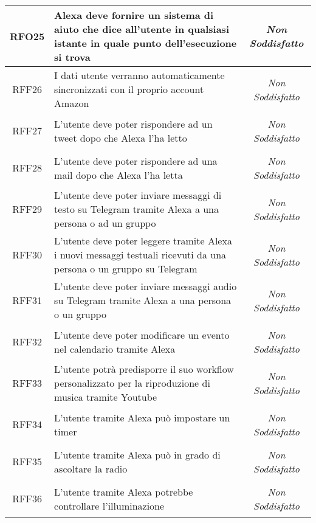\begin{longtable}{|c|>{\centering}m{7cm}|c|}
	\hypertarget{RFO25}{RFO25} & Alexa deve fornire un sistema di aiuto che dice all'utente in qualsiasi istante in quale punto dell'esecuzione si trova & \textit{Non Soddisfatto}\\ \hline
	
	\hypertarget{RFF26}{RFF26} & I dati utente verranno automaticamente sincronizzati con il proprio account Amazon & \textit{Non Soddisfatto}\\ \hline
	
	\hypertarget{RFF27}{RFF27} & L'utente deve poter rispondere ad un tweet dopo che Alexa l'ha letto & \textit{Non Soddisfatto}\\ \hline
	
	\hypertarget{RFF28}{RFF28} & L'utente deve poter rispondere ad una mail dopo che Alexa l'ha letta & \textit{Non Soddisfatto}\\ \hline
	
	\hypertarget{RFF29}{RFF29} & L'utente deve poter inviare messaggi di testo su Telegram tramite Alexa a una persona o ad un gruppo & \textit{Non Soddisfatto}\\ \hline
	
	\hypertarget{RFF30}{RFF30} &  L'utente deve poter leggere tramite Alexa i nuovi messaggi testuali ricevuti da una persona o un gruppo su Telegram & \textit{Non Soddisfatto}\\ \hline
	
	\hypertarget{RFF31}{RFF31} & L'utente deve poter inviare messaggi audio su Telegram tramite Alexa a una persona o un gruppo & \textit{Non Soddisfatto}\\ \hline
	
	\hypertarget{RFF32}{RFF32} & L'utente deve poter modificare un evento nel calendario tramite Alexa & \textit{Non Soddisfatto}\\ \hline
	
	\hypertarget{RFF33}{RFF33} & L'utente potrà predisporre il suo workflow personalizzato per la riproduzione di musica tramite Youtube & \textit{Non Soddisfatto}\\ \hline
	
	\hypertarget{RFF34}{RFF34} & L'utente tramite Alexa può impostare un timer & \textit{Non Soddisfatto}\\ \hline
	
	\hypertarget{RFF35}{RFF35} & L'utente tramite Alexa può in grado di ascoltare la radio & \textit{Non Soddisfatto}\\ \hline
	
	\hypertarget{RFF36}{RFF36} & L'utente tramite Alexa potrebbe controllare l'illuminazione & \textit{Non Soddisfatto}\\ \hline
	

\end{longtable}
